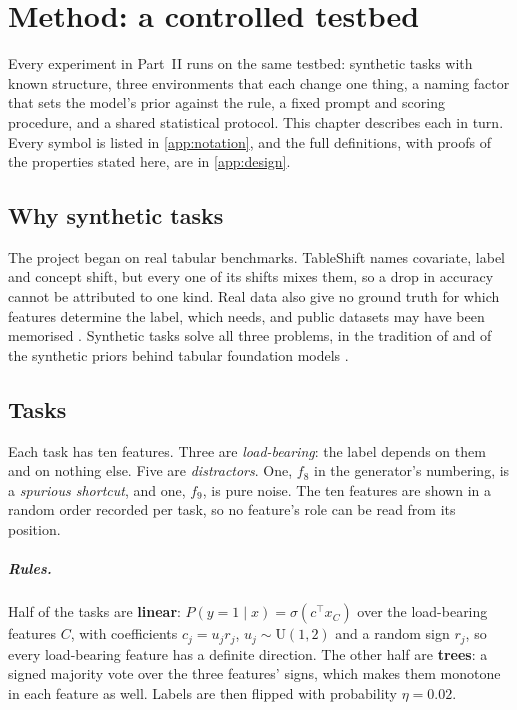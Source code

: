 \chapter{Method: a controlled testbed}
\label{ch:method}

Every experiment in Part~II runs on the same testbed: synthetic tasks with known structure, three environments that each change one thing, a naming factor that sets the model's prior against the rule, a fixed prompt and scoring procedure, and a shared statistical protocol.
This chapter describes each in turn. Every symbol is listed in \autoref{app:notation}, and the full definitions, with proofs of the properties stated here, are in \autoref{app:design}.

\section{Why synthetic tasks}
\label{sec:why-synthetic}

The project began on real tabular benchmarks.
TableShift \citep{gardner2023tableshift} names covariate, label and concept shift, but every one of its shifts mixes them, so a drop in accuracy cannot be attributed to one kind.
Real data also give no ground truth for which features determine the label, which  needs, and public datasets may have been memorised \citep{bordt2024elephants}.
Synthetic tasks solve all three problems, in the tradition of \citet{garg2022what} and of the synthetic priors behind tabular foundation models \citep{muller2022transformers,hollmann2023tabpfn}.

\section{Tasks}
\label{sec:tasks}

Each task has ten features.
Three are \emph{load-bearing}: the label depends on them and on nothing else.
Five are \emph{distractors}.
One, $f_8$ in the generator's numbering, is a \emph{spurious shortcut}, and one, $f_9$, is pure noise.
The ten features are shown in a random order recorded per task, so no feature's role can be read from its position.

\paragraph{Rules.}
Half of the tasks are \textbf{linear}: $P(y = 1 \mid x) = \sigma(c^\top x_C)$ over the load-bearing features $C$, with coefficients $c_j = u_j r_j$, $u_j \sim \mathrm{U}(1,2)$ and a random sign $r_j$, so every load-bearing feature has a definite direction.
The other half are \textbf{trees}: a signed majority vote over the three features' signs, which makes them monotone in each feature as well.
Labels are then flipped with probability $\eta = 0.02$.

